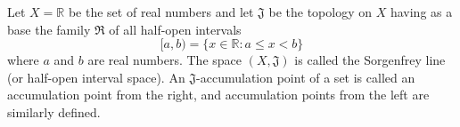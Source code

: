 Let $X = \mathbb{R}$ be the set of real numbers and let $\mathfrak{J}$ be the topology on $X$ having as a base the family $\mathfrak{R}$ of all half-open intervals
$$[a, b) = \{x \in \mathbb{R} : a \leq x < b\}$$
where $a$ and $b$ are real numbers. The space $(X, \mathfrak{J})$ is called the Sorgenfrey line (or half-open interval space). An $\mathfrak{J}$-accumulation point of a set is called an accumulation point from the right, and accumulation points from the left are similarly defined.
